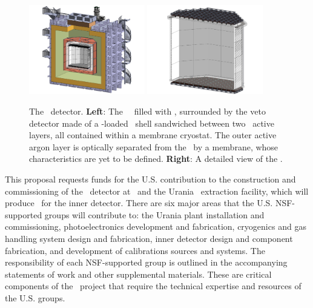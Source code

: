  
\begin{figure}[t!]
\begin{center}
\includegraphics[width=0.45\textwidth]{Figures/DSk3D.pdf}
\includegraphics[width=0.45\textwidth]{Figures/DSkTPC.pdf}
\end{center}
\caption{The \DSks\ detector. {\bf Left}: The \PMMA\ \TPC\ filled with \UAr, surrounded by the veto detector made of a -loaded \PMMA\ shell sandwiched between two \AAr\ active layers, all contained within a membrane cryostat. The outer active argon layer is optically separated from the \AAr\ by a membrane, whose characteristics are yet to be defined. {\bf Right}: A detailed view of the \TPC.}
\label{fig:DSk3D}
\end{figure}

This proposal requests funds for the U.S. contribution to the construction and commissioning of the \DSks\ detector at \LNGS\ and the Urania \UAr\ extraction facility, which will produce \UAr\ for the inner detector. There are six major areas that the U.S. NSF-supported groups will contribute to: the Urania plant installation and commissioning, photoelectronics development and fabrication, cryogenics and gas handling system design and fabrication, inner detector design and component fabrication, and development of calibrations sources and systems.  The responsibility of each NSF-supported group is outlined in the accompanying statements of work and other supplemental materials. These are critical components of the \DSk\ project that require the technical expertise and resources of the U.S. groups.


